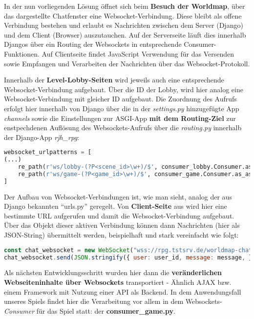 In der nun vorliegenden Lösung öffnet sich beim \textbf{Besuch der Worldmap}, über das dargestellte Chatfenster eine Websocket-Verbindung. Diese bleibt als offene Verbindung bestehen und erlaubt es Nachrichten zwischen dem Server (Django) und dem Client (Browser) auszutauchen. Auf der Serverseite läuft dies innerhalb Djangos über ein Routing der Websockets in entsprechende Consumer-Funktionen. Auf Clientseite findet JavaScript Verwendung für das Versenden sowie Empfangen und Verarbeiten der Nachrichten über das Websocket-Protokoll. 

Innerhalb der \textbf{Level-Lobby-Seiten} wird jeweils auch eine entsprechende Websocket-Verbindung aufgebaut. Über die ID der Lobby, wird hier analog eine Websocket-Verbindung mit gleicher ID aufgebaut. Die Zuordnung des Aufrufs erfolgt hier innerhalb von Django über die in der \textit{settings.py} hinzugefügte App \textit{channels} sowie die Einstellungen zur ASGI-App \textbf{mit dem Routing-Ziel} zur enstpechdenen Auflösung des Websockets-Aufrufs über die \textit{routing.py} innerhalb der Django-App \textit{rjh\_rpg}:

\begin{lstlisting}[language=python]
websocket_urlpatterns = [
(...)
    re_path(r'ws/lobby-(?P<scene_id>\w+)/$', consumer_lobby.Consumer.as_asgi()),
    re_path(r'ws/game-(?P<game_id>\w+)/$', consumer_game.Consumer.as_asgi()),
]
\end{lstlisting}

Der Aufbau von Websocket-Verbindungen ist, wie man sieht, analog der aus Django bekannten \enquote{urls.py} geregelt. Von \textbf{Client-Seite} aus wird hier eine bestimmte URL aufgerufen und damit die Websocket-Verbindung aufgebaut. Über das Objekt dieser aktiven Verbindung können dann Nachrichten (hier als JSON-String) übermittelt werden, beispielhaft und stark vereinfacht wie folgt: 


\begin{lstlisting}[language=JavaScript]
const chat_websocket = new WebSocket("wss://rpg.tstsrv.de/worldmap-chat/");
chat_websocket.send(JSON.stringify({ user: user_id, message: message, }));
\end{lstlisting}



Als nächsten Entwicklungsschritt wurden hier dann die \textbf{veränderlichen Webseiteninhalte über Websockets} transportiert - Ähnlich AJAX bzw. einem Framework mit Nutzung einer API als Backend. In dem Anwendungsfall unseres Spiels findet hier die Verarbeitung vor allem in dem Websockets-\textit{Consumer} für das Spiel statt: der \textbf{consumer\_game.py}.

